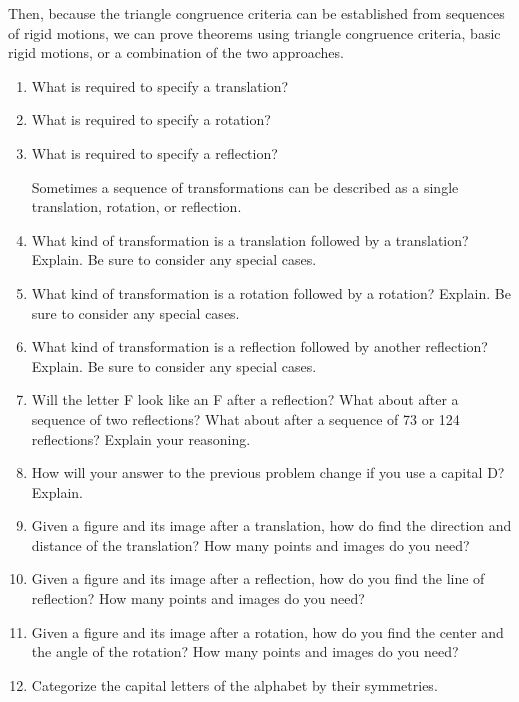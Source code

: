 Then, because the triangle congruence criteria can be established from sequences of rigid motions, we can prove theorems using triangle congruence criteria, basic rigid motions, or a combination of the two approaches.  


\begin{problems}
\begin{enumerate}

\item What is required to specify a translation?  
\item What is required to specify a rotation? 
\item What is required to specify a reflection?  

Sometimes a sequence of transformations can be described as a single translation, rotation, or reflection.  

\item What kind of transformation is a translation followed by a translation?  Explain.  Be sure to consider any special cases.  
\item What kind of transformation is a rotation followed by a rotation?  Explain.  Be sure to consider any special cases.   
\item What kind of transformation is a reflection followed by another reflection?  Explain.  Be sure to consider any special cases.  

\item Will the letter F look like an F after a reflection?  What about after a sequence of two reflections?  What about after a sequence of 73 or 124 reflections?  Explain your reasoning.  

\item How will your answer to the previous problem change if you use a capital D?  Explain.  

\item Given a figure and its image after a translation, how do find the direction and distance of the translation?    How many points and images do you need?  
\item Given a figure and its image after a reflection, how do you find the line of reflection?  How many points and images do you need?  
\item Given a figure and its image after a rotation, how do you find the center and the angle of the rotation?  How many points and images do you need?  

\item Categorize the capital letters of the alphabet by their symmetries.  


\end{enumerate}
\end{problems}
